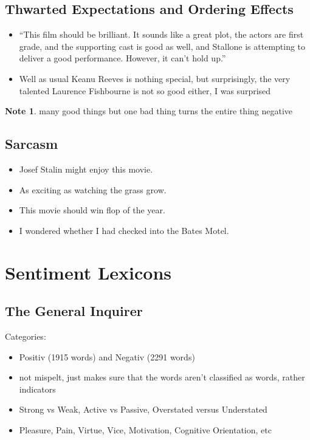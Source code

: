 \documentclass[11pt]{article}
\theoremstyle{definition}
\newtheorem{note}{Note}
\begin{document}
\subsection{Thwarted Expectations
and Ordering Effects}
\begin{itemize}
  \item “This film should be brilliant. It sounds like a great plot, the actors are first
  grade, and the supporting cast is good as well, and Stallone is attempting to
  deliver a good performance. However, it can’t hold up.”
  \item Well as usual Keanu Reeves is nothing special, but surprisingly, the very
  talented Laurence Fishbourne is not so good either, I was surprised
\end{itemize}
\begin{note}
  many good things but one bad thing turns the entire thing negative
\end{note}

\subsection{Sarcasm}
\begin{itemize}
  \item Josef Stalin might enjoy this movie.
  \item As exciting as watching the grass grow.
  \item This movie should win flop of the year.
  \item I wondered whether I had checked into the Bates Motel.
\end{itemize}

\section{Sentiment Lexicons}
\subsection{The General Inquirer}
Categories:

\begin{itemize}
  \item Positiv (1915 words) and Negativ (2291 words)
  \item not mispelt, just makes sure that the words aren't classified as words, rather indicators
  \item Strong vs Weak, Active vs Passive, Overstated versus Understated
  \item Pleasure, Pain, Virtue, Vice, Motivation, Cognitive Orientation, etc
\end{itemize}
\end{document}
